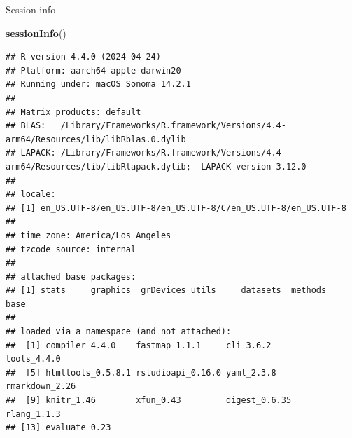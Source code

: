\documentclass[
  ignorenonframetext,
]{beamer}
\newenvironment{Shaded}{\begin{snugshade}}{\end{snugshade}}
\newcommand{\FunctionTok}[1]{\textcolor[rgb]{0.13,0.29,0.53}{\textbf{#1}}}
\newcommand{\NormalTok}[1]{#1}
\begin{document}
\begin{frame}[fragile]{Session info}
\label{session-info}
\tiny

\begin{Shaded}
\begin{Highlighting}[]
\FunctionTok{sessionInfo}\NormalTok{()}
\end{Highlighting}
\end{Shaded}

\begin{verbatim}
## R version 4.4.0 (2024-04-24)
## Platform: aarch64-apple-darwin20
## Running under: macOS Sonoma 14.2.1
## 
## Matrix products: default
## BLAS:   /Library/Frameworks/R.framework/Versions/4.4-arm64/Resources/lib/libRblas.0.dylib 
## LAPACK: /Library/Frameworks/R.framework/Versions/4.4-arm64/Resources/lib/libRlapack.dylib;  LAPACK version 3.12.0
## 
## locale:
## [1] en_US.UTF-8/en_US.UTF-8/en_US.UTF-8/C/en_US.UTF-8/en_US.UTF-8
## 
## time zone: America/Los_Angeles
## tzcode source: internal
## 
## attached base packages:
## [1] stats     graphics  grDevices utils     datasets  methods   base     
## 
## loaded via a namespace (and not attached):
##  [1] compiler_4.4.0    fastmap_1.1.1     cli_3.6.2         tools_4.4.0      
##  [5] htmltools_0.5.8.1 rstudioapi_0.16.0 yaml_2.3.8        rmarkdown_2.26   
##  [9] knitr_1.46        xfun_0.43         digest_0.6.35     rlang_1.1.3      
## [13] evaluate_0.23
\end{verbatim}
\end{frame}
\end{document}
